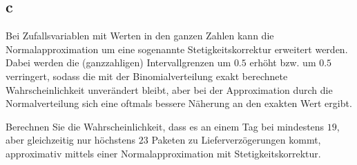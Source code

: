\subsection{c}

Bei Zufallsvariablen mit Werten in den ganzen Zahlen kann die
Normalapproximation um eine sogenannte Stetigkeitskorrektur erweitert werden.
Dabei werden die (ganzzahligen) Intervallgrenzen um $0.5$ erhöht bzw. um $0.5$
verringert, sodass die mit der Binomialverteilung exakt berechnete
Wahrscheinlichkeit unverändert bleibt, aber bei der Approximation durch die
Normalverteilung sich eine oftmals bessere Näherung an den exakten Wert ergibt.

Berechnen Sie die Wahrscheinlichkeit, dass es an einem Tag bei mindestens $19$,
aber gleichzeitig nur höchstens $23$ Paketen zu Lieferverzögerungen kommt,
approximativ mittels einer Normalapproximation mit Stetigkeitskorrektur.

